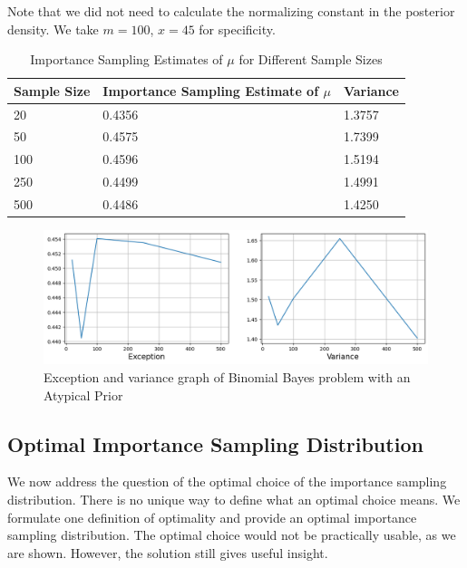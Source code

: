 \begin{example}
	Note that we did not need to calculate the normalizing constant in the posterior density.
	We take $m=100$, $x=45$ for specificity.
	\begin{table}[H]
		\centering
		\begin{tabular}{|l|p{4.5cm}|p{2cm}|}
			\hline
			Sample Size & Importance Sampling Estimate of $\mu$ & Variance \\
			\hline
            20 & 0.4356 & 1.3757 \\
            50 & 0.4575 & 1.7399 \\
            100 & 0.4596 & 1.5194 \\
            250 & 0.4499 & 1.4991 \\
            500 & 0.4486 & 1.4250 \\
			\hline
		\end{tabular}
		\caption{Importance Sampling Estimates of $\mu$ for Different Sample Sizes}
		\label{tab:importance-sampling-mu}
	\end{table}
    \begin{figure}[H]
        \centering
        \includegraphics[width=1\textwidth]{images/importance-sampling/imsamp-ex2.png}
        \caption{Exception and variance graph of Binomial Bayes problem with an Atypical Prior}
    \end{figure}
\end{example}

\subsection{Optimal Importance Sampling Distribution}
We now address the question of the optimal choice of the importance sampling
distribution. There is no unique way to define what an optimal choice means. We
formulate one definition of optimality and provide an optimal importance sampling
distribution. The optimal choice would not be practically usable, as we are shown.
However, the solution still gives useful insight.

